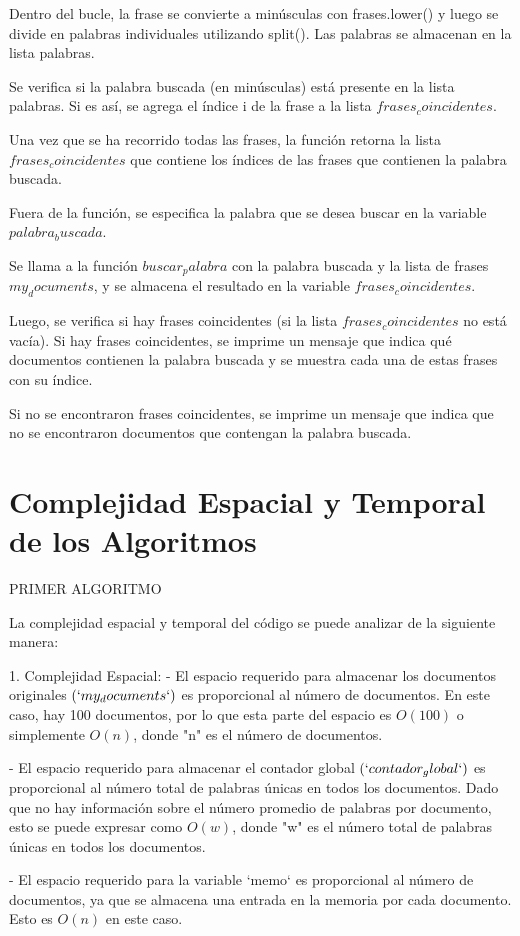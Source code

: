 \documentclass[a4paper,twocolumn,10pt]{article}
\begin{document}
Dentro del bucle, la frase se convierte a minúsculas con frases.lower() y luego se divide en palabras individuales utilizando split(). Las palabras se almacenan en la lista palabras.

Se verifica si la palabra buscada (en minúsculas) está presente en la lista palabras. Si es así, se agrega el índice i de la frase a la lista $frases_coincidentes$.

Una vez que se ha recorrido todas las frases, la función retorna la lista $frases_coincidentes$ que contiene los índices de las frases que contienen la palabra buscada.

Fuera de la función, se especifica la palabra que se desea buscar en la variable $palabra_buscada$.

Se llama a la función $buscar_palabra$ con la palabra buscada y la lista de frases $my_documents$, y se almacena el resultado en la variable $frases_coincidentes$.

Luego, se verifica si hay frases coincidentes (si la lista $frases_coincidentes$ no está vacía). Si hay frases coincidentes, se imprime un mensaje que indica qué documentos contienen la palabra buscada y se muestra cada una de estas frases con su índice.

Si no se encontraron frases coincidentes, se imprime un mensaje que indica que no se encontraron documentos que contengan la palabra buscada.
\section{Complejidad Espacial y Temporal de los Algoritmos }

PRIMER ALGORITMO

La complejidad espacial y temporal del código se puede analizar de la siguiente manera:

1. Complejidad Espacial:
   - El espacio requerido para almacenar los documentos originales $(`my_documents`)$ es proporcional al número de documentos. En este caso, hay 100 documentos, por lo que esta parte del espacio es $O(100)$ o simplemente $O(n)$, donde "n" es el número de documentos.

   - El espacio requerido para almacenar el contador global $(`contador_global`)$ es proporcional al número total de palabras únicas en todos los documentos. Dado que no hay información sobre el número promedio de palabras por documento, esto se puede expresar como $O(w)$, donde "w" es el número total de palabras únicas en todos los documentos.

   - El espacio requerido para la variable `memo` es proporcional al número de documentos, ya que se almacena una entrada en la memoria por cada documento. Esto es $O(n)$ en este caso.
\end{document}
